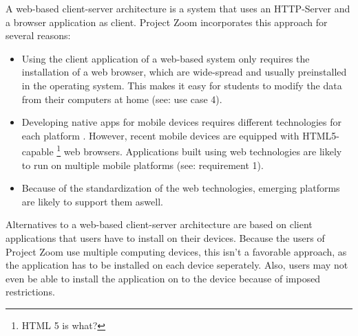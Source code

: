 
A web-based client-server architecture is a system that uses an HTTP-Server \cite{RFC2616} and a browser application as client. Project Zoom incorporates this approach for several reasons:
\begin{itemize}
\item Using the client application of a web-based system only requires the installation of a web browser, which are wide-spread and usually preinstalled in the operating system. This makes it easy for students to modify the data from their computers at home (see: use case 4).
\item Developing native apps for mobile devices requires different technologies for each platform \cite{Charland_2011}. However, recent mobile devices are equipped with HTML5-capable \footnote{HTML 5 is what?} web browsers. Applications built using web technologies are likely to run on multiple mobile platforms (see: requirement 1).
\item Because of the standardization of the web technologies, emerging platforms are likely to support them aswell.
\end{itemize}

Alternatives to a web-based client-server architecture are based on client applications that users have to install on their devices. Because the users of Project Zoom use multiple computing devices, this isn't a favorable approach, as the application has to be installed on each device seperately. Also, users may not even be able to install the application on to the device because of imposed restrictions.